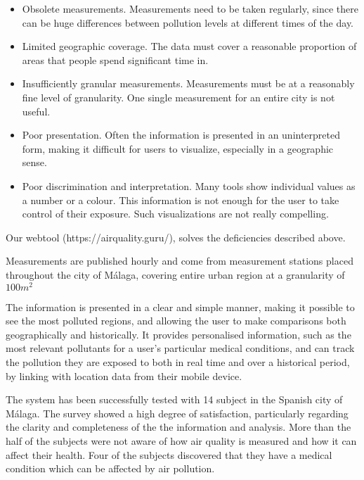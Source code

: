 \begin{itemize}

\item Obsolete measurements. Measurements need to be taken regularly, since there can be huge differences
between pollution levels at different times of the day.

\item Limited geographic coverage. The data must cover a reasonable proportion of areas that people spend significant time in.

\item Insufficiently granular measurements. Measurements must be at a reasonably fine level of granularity. One single measurement for an entire city is not useful.

\item Poor presentation. Often the information is presented in an uninterpreted form, making it difficult for users to visualize, especially in a geographic sense.

\item Poor discrimination and interpretation. Many tools show individual values as a number or a colour. This information is not
enough for the user to take control of their exposure. Such visualizations are not really compelling. 

\end{itemize}

Our webtool (https://airquality.guru/), solves the deficiencies described above.

Measurements are published hourly and come from measurement stations placed throughout the 
city of Málaga, covering entire urban region at a granularity of $100m^2$

The information is presented in a clear and simple manner, making it possible to see the most polluted regions,
and allowing the user to make comparisons both geographically and historically. It provides personalised information, such as the most relevant 
pollutants for a user's particular medical conditions, and can track
the pollution they are exposed to both in real time and over a historical period, by linking with location data from their mobile device. 

The system has been successfully tested with 14 subject in the Spanish city of Málaga. The survey showed a high degree of satisfaction, 
particularly regarding the clarity and completeness of the the information and analysis.
More than the half of the subjects were not aware of how air quality is measured and how it 
can affect their health. Four of the subjects discovered that they have a medical 
condition which can be affected by air pollution.
    
